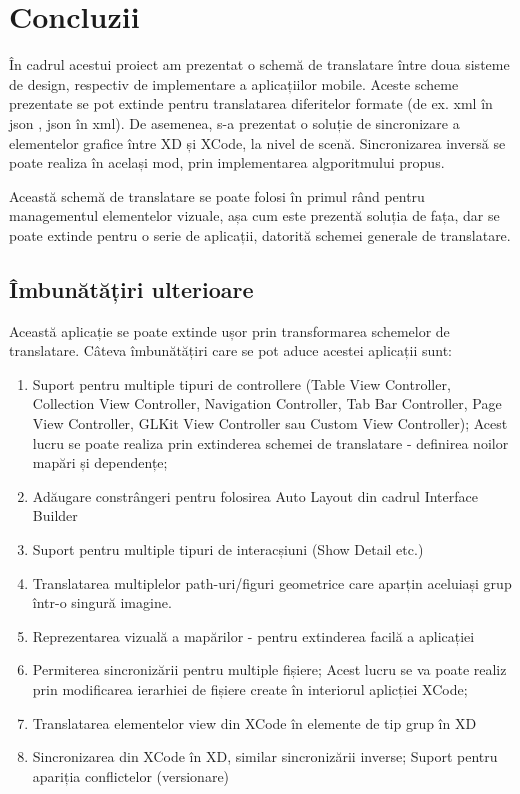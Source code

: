 \chapter{Concluzii}

În cadrul acestui proiect am prezentat o schemă de translatare între doua sisteme de design, respectiv de implementare a aplicațiilor mobile. Aceste scheme prezentate se pot extinde pentru translatarea diferitelor formate (de ex. xml în json , json în xml). De asemenea, s-a prezentat o soluție de sincronizare a elementelor grafice între XD și XCode, la nivel de scenă. Sincronizarea inversă se poate realiza în același mod, prin implementarea algporitmului propus.

Această schemă de translatare se poate folosi în primul rând pentru managementul elementelor vizuale, așa cum este prezentă soluția de fața, dar se poate extinde pentru o serie de aplicații, datorită schemei generale de translatare.

\section{Îmbunătățiri ulterioare}

Această aplicație se poate extinde ușor prin transformarea schemelor de translatare.
Câteva îmbunătățiri care se pot aduce acestei aplicații sunt:

\begin{enumerate}
\item Suport pentru multiple tipuri de controllere (Table View Controller, Collection View Controller, Navigation Controller, Tab Bar Controller, Page View Controller, GLKit View Controller sau Custom View Controller); Acest lucru se poate realiza prin extinderea schemei de translatare - definirea noilor mapări și dependențe;
\item Adăugare constrângeri pentru folosirea Auto Layout din cadrul Interface Builder
\item Suport pentru multiple tipuri de interacșiuni (Show Detail etc.)
\item Translatarea multiplelor path-uri/figuri geometrice care aparțin aceluiași grup într-o singură imagine. 
\item Reprezentarea vizuală a mapărilor - pentru extinderea facilă a aplicației
\item Permiterea sincronizării pentru multiple fișiere; Acest lucru se va poate realiz prin modificarea ierarhiei de fișiere create în interiorul aplicției XCode;
\item Translatarea elementelor view din XCode în elemente de tip grup în XD
\item Sincronizarea din XCode în XD, similar sincronizării inverse; Suport pentru apariția conflictelor (versionare)
\end{enumerate}


